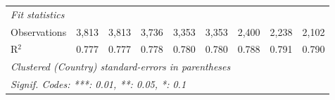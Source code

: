 \begin{tabular}{lcccccccc}
   \midrule \emph{Fit statistics}\\
   Observations                                              & 3,813         & 3,813         & 3,736         & 3,353         & 3,353         & 2,400          & 2,238          & 2,102\\  
   R$^2$                                                     & 0.777         & 0.777         & 0.778         & 0.780         & 0.780         & 0.788          & 0.791          & 0.790\\  
   \midrule
   \multicolumn{9}{l}{\emph{Clustered (Country) standard-errors in parentheses}}\\
   \multicolumn{9}{l}{\emph{Signif. Codes: ***: 0.01, **: 0.05, *: 0.1}}\\
\end{tabular}
\par\endgroup


